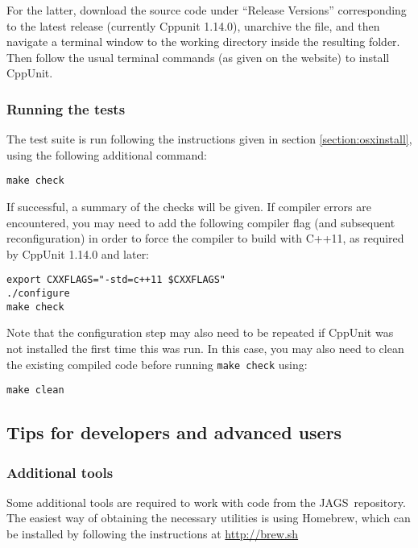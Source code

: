 \documentclass[11pt, a4paper, titlepage]{article}
\newcommand{\JAGS}{\textsf{JAGS}}
\begin{document}
For the latter, download the source code under ``Release Versions'' corresponding 
to the latest release (currently Cppunit 1.14.0), unarchive the file, and then navigate 
a terminal window to the working directory inside the resulting folder.  Then follow 
the usual terminal commands (as given on the website) to install CppUnit.  

\subsubsection{Running the tests}

The test suite is run following the instructions given in section \ref{section:osxinstall}, 
using the following additional command:

\begin{verbatim} 
make check
\end{verbatim} 

If successful, a summary of the checks will be given.  If compiler errors are encountered, 
you may need to add the following compiler flag (and subsequent reconfiguration) in order to force 
the compiler to build with C++11, as required by CppUnit 1.14.0 and later:

\begin{verbatim} 
export CXXFLAGS="-std=c++11 $CXXFLAGS"
./configure
make check
\end{verbatim}

Note that the configuration step may also need to be repeated if CppUnit 
was not installed the first time this was run.  In this case, you may 
also need to clean the existing compiled code before running \texttt{make check} using:

\begin{verbatim} 
make clean
\end{verbatim} 



\subsection{Tips for developers and advanced users}

\subsubsection{Additional tools}
\label{section:osxtools}

Some additional tools are required to work with code from the \JAGS\ repository.
The easiest way of obtaining the necessary utilities is using Homebrew,
which can be installed by following the instructions at \url{http://brew.sh}
\end{document}
